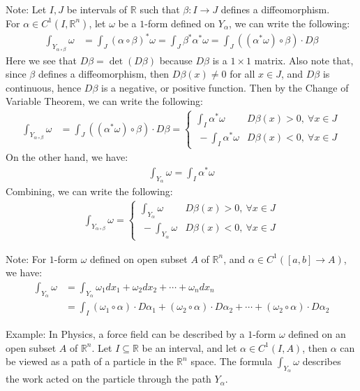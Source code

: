 \documentclass[15pt]{book}
\theoremstyle{break}
\theoremstyle{break}
\newcommand{\R}{\mathbb{R}}
\newcommand{\note}{\color{red}Note: \color{black}}
\newcommand{\example}{\color{green}Example: \color{black}}
\begin{document}
\note Let $I,J$ be intervals of $\R$ such that $\beta:I\to J$ defines a diffeomorphism. \\
For $\alpha \in C^1(I,\R^n)$, let $\omega$ be a $1$-form defined on $Y_\alpha$, we can write the following:
\begin{align*}
\int_{Y_{\alpha\circ \beta}} \omega &= \int_{J} (\alpha\circ \beta)^*\omega =\int_J \beta^*\alpha^*\omega = \int_J ((\alpha^*\omega) \circ \beta)\cdot D\beta
\end{align*}
Here we see that $D\beta = \det(D\beta)$ because $D\beta$ is a $1\times 1$ matrix. Also note that, since $\beta$ defines a diffeomorphism, then $D\beta(x)\neq 0$ for all $x \in J$, and $D\beta$ is continuous, hence $D\beta$ is a negative, or positive function. Then by the Change of Variable Theorem, we can write the following:
\begin{align*}
\int_{Y_{\alpha\circ \beta}} \omega &= \int_J ((\alpha^*\omega) \circ \beta)\cdot D\beta = \begin{cases}\int_I \alpha^*\omega & D\beta(x) > 0,\ \forall x \in J\\\ -\int_I \alpha^*\omega & D\beta(x) < 0,\ \forall x \in J \end{cases}
\end{align*}
On the other hand, we have:
\begin{align*}
\int_{Y_\alpha} \omega = \int_{I} \alpha^*\omega 
\end{align*}
Combining, we can write the following:
\begin{align*}
\int_{Y_{\alpha\circ \beta}} \omega = \begin{cases}\int_{Y_\alpha} \omega & D\beta(x) > 0,\ \forall x \in J\\\ -\int_{Y_\alpha} \omega & D\beta(x) < 0,\ \forall x \in J \end{cases}
\end{align*}

\note For $1$-form $\omega$ defined on open subset $A$ of $\R^n$, and $\alpha\in C^1([a,b] \to A)$, we have:
\begin{align*}
\int_{Y_\alpha} \omega &= \int_{Y_\alpha} \omega_1dx_1+\omega_2dx_2+\cdots +\omega_n dx_n \\&= \int_{I} (\omega_1\circ \alpha)\cdot  D\alpha_1 + (\omega_2\circ \alpha)\cdot  D\alpha_2
+\cdots + (\omega_2\circ \alpha)\cdot  D\alpha_2
\end{align*}

\example In Physics, a force field can be described by a $1$-form $\omega$ defined on an open subset $A$ of $\R^n$. Let $I\subseteq \R$ be an interval, and let $\alpha\in C^1(I,A)$, then $\alpha$ can be viewed as a path of a particle in the $\R^n$ space. The formula $\int_{Y_\alpha} \omega$ describes the work acted on the particle through the path $Y_\alpha$.\\
\end{document}
